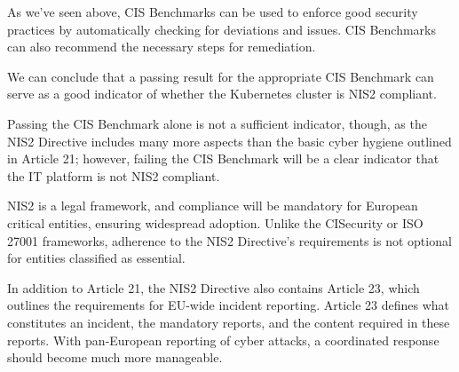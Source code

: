 As we've seen above, CIS Benchmarks can be used to enforce good security practices by automatically checking for deviations and issues. CIS Benchmarks can also recommend the necessary steps for remediation.

We can conclude that a passing result for the appropriate CIS Benchmark can serve as a good indicator of whether the Kubernetes cluster is NIS2 compliant.

Passing the CIS Benchmark alone is not a sufficient indicator, though, as the NIS2 Directive includes many more aspects than the basic cyber hygiene outlined in Article 21; however, failing the CIS Benchmark will be a clear indicator that the IT platform is not NIS2 compliant.

NIS2 is a legal framework, and compliance will be mandatory for European critical entities, ensuring widespread adoption. Unlike the CISecurity or ISO 27001 frameworks, adherence to the NIS2 Directive's requirements is not optional for entities classified as essential.

In addition to Article 21, the NIS2 Directive also contains Article 23, which outlines the requirements for EU-wide incident reporting. Article 23 defines what constitutes an incident, the mandatory reports, and the content required in these reports. With pan-European reporting of cyber attacks, a coordinated response should become much more manageable.

